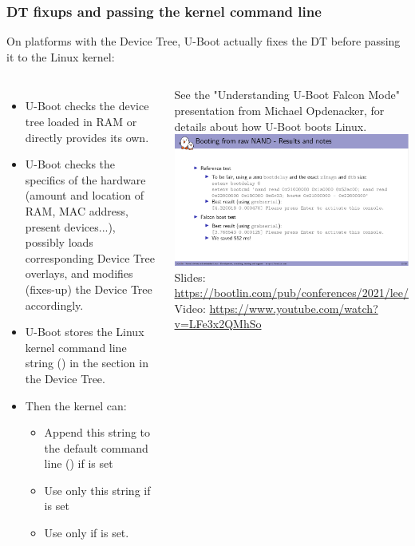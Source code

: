 \begin{frame}
  \frametitle{DT fixups and passing the kernel command line}
  \footnotesize
  On platforms with the Device Tree, U-Boot actually fixes the DT
  before passing it to the Linux kernel:
  \begin{columns}
  \begin{itemize}
     \item U-Boot checks the device tree loaded in RAM
           or directly provides its own.
     \item U-Boot checks the specifics of the hardware
           (amount and location of RAM, MAC address, present
           devices...), possibly loads corresponding Device Tree overlays,
           and modifies (fixes-up) the Device Tree accordingly.
     \item U-Boot stores the Linux kernel command line string
            () in the  section
            in the Device Tree.
     \item Then the kernel can:
           \begin{itemize}
	   \item Append this string to the default command line
                 () if  is set
           \item Use only this string if  is set
	   \item Use only  if  is set.
           \end{itemize}
  \end{itemize}
    \tiny See the "Understanding U-Boot Falcon Mode"
    presentation from Michael Opdenacker, for details about how U-Boot boots Linux.\\
    \vspace{0.6cm}
    \includegraphics[width=\textwidth]{slides/sysdev-kernel-building/understanding-falcon-mode-presentation.png}\\
    \vspace{0.4cm}
    \tiny Slides: \url{https://bootlin.com/pub/conferences/2021/lee/}\\
    Video: \url{https://www.youtube.com/watch?v=LFe3x2QMhSo}
  \end{columns}
\end{frame}
